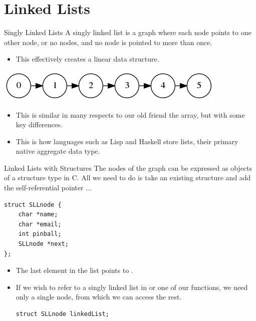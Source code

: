 \documentclass[11pt]{beamer}
\let\OldTexttt\texttt
\renewcommand{\texttt}[1]{\OldTexttt{\color{teal}{#1}}}
\begin{document}
\section[Linked Lists]{Linked Lists}
\begin{frame}{Singly Linked Lists}
A singly linked list is a graph where each node points to one other node, or no nodes, and no node is pointed to more than once.  
\begin{itemize}
\item This effectively creates a linear data structure.
\end{itemize}
\center
\includegraphics[scale=0.3]{graphs/SLL_simple.png}
\flushright
\begin{itemize}
\item This is similar in many respects to our old friend the array, but with some key differences.  
\item This is how languages such as Lisp and Haskell store lists, their primary native aggregate data type. 
\end{itemize}
\end{frame}

\begin{frame}[fragile=singleslide]{Linked Lists with Structures}
The nodes of the graph can be expressed as objects of a structure type in C.  All we need to do is take an existing structure and add the self-referential pointer \texttt{*next}...
\begin{lstlisting}[style=C]
struct SLLnode {
	char *name;
	char *email;
	int pinball;
	SLLnode *next;
};
\end{lstlisting} 
\begin{itemize}
\item The last element in the list points to \texttt{NULL}.
\item If we wish to refer to a singly linked list in \texttt{main()} or one of our functions, we need only a single node, from which we can access the rest.
\begin{lstlisting}[style=C]
struct SLLnode linkedList;
\end{lstlisting} 
\end{itemize}
\end{frame}
\end{document}
